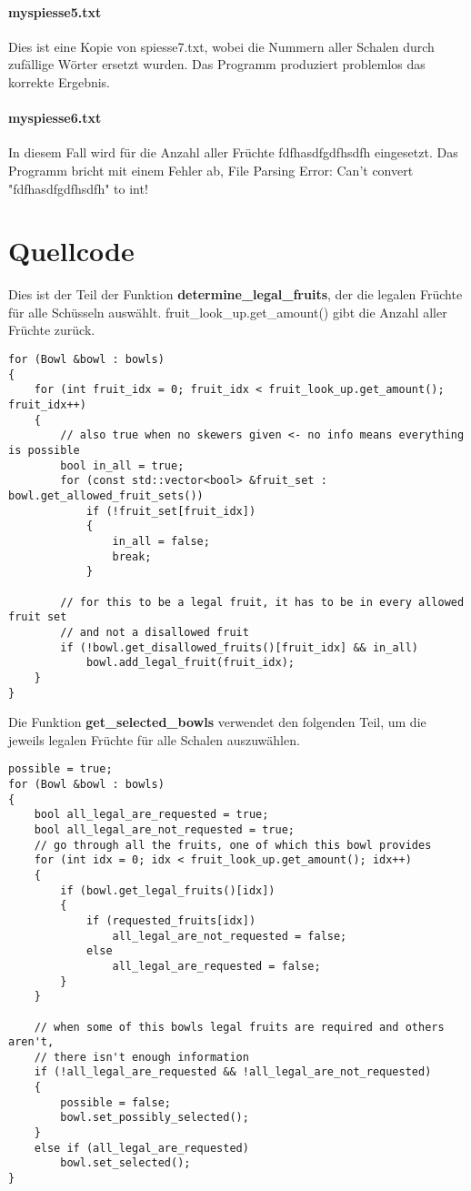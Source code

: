 \documentclass[a4paper,10pt,ngerman]{scrartcl}
\begin{document}
\paragraph{myspiesse5.txt}
Dies ist eine Kopie von spiesse7.txt, wobei die Nummern aller Schalen durch zufällige Wörter ersetzt wurden.
Das Programm produziert problemlos das korrekte Ergebnis.

\paragraph{myspiesse6.txt}
In diesem Fall wird für die Anzahl aller Früchte \glqq fdfhasdfgdfhsdfh\grqq{} eingesetzt.
Das Programm bricht mit einem Fehler ab, \glqq File Parsing Error: Can't convert "fdfhasdfgdfhsdfh" to int!\grqq{}

\section{Quellcode}
Dies ist der Teil der Funktion \textbf{determine\_legal\_fruits}, der die legalen Früchte für alle Schüsseln auswählt.
\glqq fruit\_look\_up.get\_amount()\grqq{} gibt die Anzahl aller Früchte zurück.
\begin{lstlisting}
for (Bowl &bowl : bowls)
{
    for (int fruit_idx = 0; fruit_idx < fruit_look_up.get_amount(); fruit_idx++)
    {
        // also true when no skewers given <- no info means everything is possible
        bool in_all = true;
        for (const std::vector<bool> &fruit_set : bowl.get_allowed_fruit_sets())
            if (!fruit_set[fruit_idx])
            {
                in_all = false;
                break;
            }

        // for this to be a legal fruit, it has to be in every allowed fruit set
        // and not a disallowed fruit
        if (!bowl.get_disallowed_fruits()[fruit_idx] && in_all)
            bowl.add_legal_fruit(fruit_idx);
    }
}
\end{lstlisting}

Die Funktion \textbf{get\_selected\_bowls} verwendet den folgenden Teil, um die jeweils legalen Früchte für alle Schalen auszuwählen.
\begin{lstlisting}
possible = true;
for (Bowl &bowl : bowls)
{
    bool all_legal_are_requested = true;
    bool all_legal_are_not_requested = true;
    // go through all the fruits, one of which this bowl provides
    for (int idx = 0; idx < fruit_look_up.get_amount(); idx++)
    {
        if (bowl.get_legal_fruits()[idx])
        {
            if (requested_fruits[idx])
                all_legal_are_not_requested = false;
            else
                all_legal_are_requested = false;
        }
    }

    // when some of this bowls legal fruits are required and others aren't,
    // there isn't enough information
    if (!all_legal_are_requested && !all_legal_are_not_requested)
    {
        possible = false;
        bowl.set_possibly_selected();
    }
    else if (all_legal_are_requested)
        bowl.set_selected();
}
\end{lstlisting}
\end{document}
